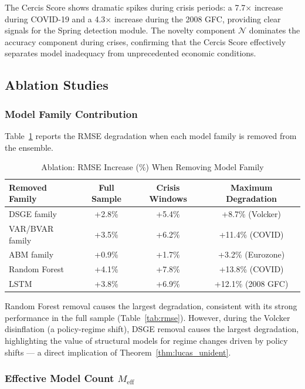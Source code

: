 \documentclass[12pt,a4paper]{article}
\begin{document}
The Cercis Score shows dramatic spikes during crisis periods: a
7.7$\times$ increase during COVID-19 and a 4.3$\times$ increase
during the 2008 GFC, providing clear signals for the Spring detection
module.  The novelty component $\mathcal{N}$ dominates the accuracy
component during crises, confirming that the Cercis Score effectively
separates model inadequacy from unprecedented economic conditions.

\subsection{Ablation Studies}

\subsubsection{Model Family Contribution}

Table~\ref{tab:ablation} reports the RMSE degradation when each
model family is removed from the ensemble.

\begin{table}[htbp]
\centering
\caption{Ablation: RMSE Increase (\%) When Removing Model Family}
\label{tab:ablation}
\begin{tabular}{lccc}
\toprule
Removed Family  & Full Sample & Crisis Windows & Maximum Degradation \\
\midrule
DSGE family     & +2.8\%  & +5.4\%  & +8.7\% (Volcker) \\
VAR/BVAR family & +3.5\%  & +6.2\%  & +11.4\% (COVID) \\
ABM family      & +0.9\%  & +1.7\%  & +3.2\% (Eurozone) \\
Random Forest   & +4.1\%  & +7.8\%  & +13.8\% (COVID) \\
LSTM            & +3.8\%  & +6.9\%  & +12.1\% (2008 GFC) \\
\bottomrule
\end{tabular}
\end{table}

Random Forest removal causes the largest degradation, consistent with
its strong performance in the full sample (Table~\ref{tab:rmse}).
However, during the Volcker disinflation (a policy-regime shift),
DSGE removal causes the largest degradation, highlighting the value
of structural models for regime changes driven by policy shifts ---
a direct implication of Theorem~\ref{thm:lucas_unident}.

\subsubsection{Effective Model Count $M_{\text{eff}}$}
\end{document}
